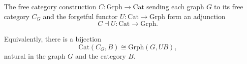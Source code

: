 The free category construction $C : \text{Grph} \to \text{Cat}$ sending each graph $G$ to its free category $C_G$ and the forgetful functor $U : \text{Cat} \to \text{Grph}$ form an adjunction
$$C \dashv U : \text{Cat} \to \text{Grph}.$$

Equivalently, there is a bijection
$$\text{Cat}(C_G, B) \cong \text{Grph}(G, UB),$$
natural in the graph $G$ and the category $B$.

